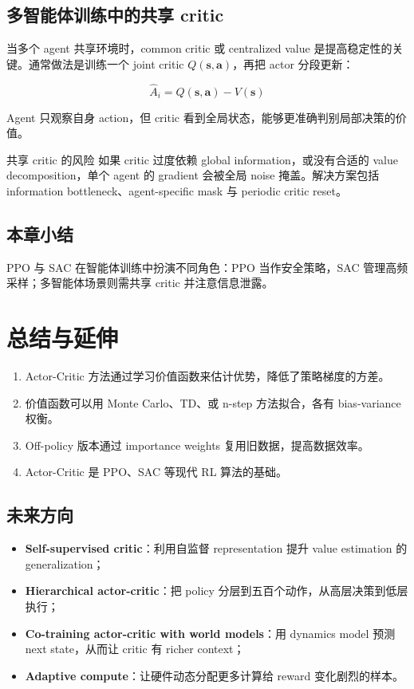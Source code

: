 \documentclass[a4paper]{article}
\begin{document}
\subsection{多智能体训练中的共享 critic}

当多个 agent 共享环境时，common critic 或 centralized value 是提高稳定性的关键。通常做法是训练一个 joint critic $Q(\boldsymbol{s}, \boldsymbol{a})$，再把 actor 分段更新：

$$\hat{A}_i = Q(\boldsymbol{s}, \boldsymbol{a}) - V(\boldsymbol{s})$$

Agent 只观察自身 action，但 critic 看到全局状态，能够更准确判别局部决策的价值。

\begin{warningbox}{共享 critic 的风险}
如果 critic 过度依赖 global information，或没有合适的 value decomposition，单个 agent 的 gradient 会被全局 noise 掩盖。解决方案包括 information bottleneck、agent-specific mask 与 periodic critic reset。
\end{warningbox}

\subsection{本章小结}

PPO 与 SAC 在智能体训练中扮演不同角色：PPO 当作安全策略，SAC 管理高频采样；多智能体场景则需共享 critic 并注意信息泄露。

\section{总结与延伸}

\begin{enumerate}
    \item Actor-Critic 方法通过学习价值函数来估计优势，降低了策略梯度的方差。
    \item 价值函数可以用 Monte Carlo、TD、或 n-step 方法拟合，各有 bias-variance 权衡。
    \item Off-policy 版本通过 importance weights 复用旧数据，提高数据效率。
    \item Actor-Critic 是 PPO、SAC 等现代 RL 算法的基础。
\end{enumerate}

\subsection{未来方向}

\begin{itemize}
    \item \textbf{Self-supervised critic}：利用自监督 representation 提升 value estimation 的 generalization；
    \item \textbf{Hierarchical actor-critic}：把 policy 分层到五百个动作，从高层决策到低层执行；
    \item \textbf{Co-training actor-critic with world models}：用 dynamics model 预测 next state，从而让 critic 有 richer context；
    \item \textbf{Adaptive compute}：让硬件动态分配更多计算给 reward 变化剧烈的样本。
\end{itemize}
\end{document}
